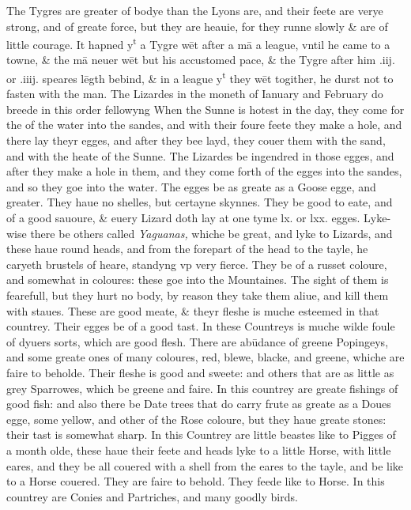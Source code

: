 \documentclass[11pt,twoside]{article}\makeatletter
\begin{document}
	\normalmarginpar
       The Tygres are greater of bodye than the Lyons are, and 
	\normalmarginpar
       their feete are verye strong, and of greate force, but they are heauie, for they runne slowly \& are of little courage. It hapned y\textsuperscript{t} a Tygre wēt after a mā a league, vntil he came to a towne, \& the mā neuer wēt but his accustomed pace, \& the Tygre af­ter him .iij. or .iiij. speares lēgth bebind, \& in a league y\textsuperscript{t} they wēt %
 togither, he durst not to fasten with the man. The Lizardes in 
	\normalmarginpar
       the moneth of Ianuary and February do breede in this order fellowyng When the Sunne is hotest in the day, they come for the of the water into the sandes, and with their foure feete they make a hole, and there lay theyr egges, and after they bee layd, they couer them with the sand, and with the heate of the Sunne. The Lizardes be ingendred in those egges, and after they make a hole in them, and they come forth of the egges in­to the sandes, and so they goe into the water. The egges be as greate as a Goose egge, and greater. They haue no shelles, but certayne skynnes. They be good to eate, and of a good sauoure, \& euery Lizard doth lay at one tyme lx. or lxx. egges. Lyke­wise there be others called {\itshape Yaguanas,} whiche be great, and lyke 
	\normalmarginpar
       to Lizards, and these haue round heads, and from the forepart of the head to the tayle, he caryeth brustels of heare, standyng vp very fierce. They be of a russet coloure, and somewhat in coloures: these goe into the Mountaines. The sight of them is fearefull, but they hurt no body, by reason they take them a­liue, and kill them with staues. These are good meate, \& theyr fleshe is muche esteemed in that countrey. Their egges be of a good tast. In these Countreys is muche wilde foule of dyuers sorts, which are good flesh. There are abūdance of greene Po­pingeys, and some greate ones of many coloures, red, blewe, blacke, and greene, whiche are faire to beholde. Their fleshe is good and sweete: and others that are as little as grey Spar­rowes, which be greene and faire. In this countrey are greate fishings of good fish: and also there be Date trees that do carry frute as greate as a Doues egge, some yellow, and other of the Rose coloure, but they haue greate stones: their tast is somewhat sharp. In this Countrey are little beastes like to Pigges of a month olde, these haue their feete and heads lyke to a little Horse, with little eares, and they be all couered with a shell from the eares to the tayle, and be like to a Horse coue­red. They are faire to behold. They feede like to Horse. In this countrey are Conies and Partriches, and many goodly birds. %
\end{document}

